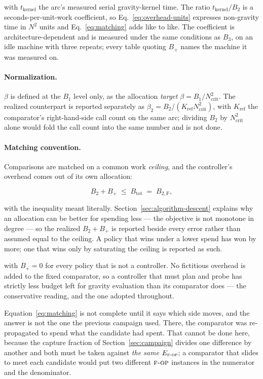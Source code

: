 with $t_{\mathrm{kernel}}$ the arc's measured serial gravity-kernel time. The
ratio $t_{\mathrm{kernel}}/B_2$ is a seconds-per-unit-work coefficient, so
Eq.~\eqref{eq:overhead-units} expresses non-gravity time in $N^2$ units and
Eq.~\eqref{eq:matching} adds like to like. The coefficient is
architecture-dependent and is measured under the same conditions as $B_3$, on
an idle machine with three repeats; every table quoting $B_+$ names the machine
it was measured on.

\paragraph{Normalization.} $\beta$ is defined at the $B_1$ level only, as the
allocation \emph{target} $\beta=B_1/N_{\mathrm{crit}}^2$. The realized
counterpart is reported separately as
$\beta_2 = B_2/(K_{\mathrm{ref}}N_{\mathrm{crit}}^2)$, with
$K_{\mathrm{ref}}$ the comparator's right-hand-side call count on the same arc;
dividing $B_2$ by $N_{\mathrm{crit}}^2$ alone would fold the call count into
the same number and is not done.

\paragraph{Matching convention.} Comparisons are matched on a common work
\emph{ceiling}, and the controller's overhead comes out of its own allocation:

\begin{equation}
  B_2 + B_+ \;\le\; B_{\mathrm{tot}} \;=\; B_{2,\mathrm{F}} ,
  \label{eq:matching}
\end{equation}

with the inequality meant literally. Section~\ref{sec:algorithm-descent}
explains why an allocation can be better for spending less --- the objective
is not monotone in degree --- so the realized $B_2+B_+$ is reported beside
every error rather than assumed equal to the ceiling. A policy that wins under
a lower spend has won by more; one that wins only by saturating the ceiling is
reported as such.

with $B_+=0$ for every policy that is not a controller. No fictitious overhead
is added to the fixed comparator, so a controller that must plan and probe has
strictly less budget left for gravity evaluation than its comparator does ---
the conservative reading, and the one adopted throughout.

Equation~\eqref{eq:matching} is not complete until it says which side moves,
and the answer is not the one the previous campaign used. There, the comparator
was re-propagated to spend what the candidate had spent. That cannot be done
here, because the capture fraction of Section~\ref{sec:campaign} divides one
difference by another and both must be taken against \emph{the same}
$E_{\textsc{f-op}}$; a comparator that slides to meet each candidate would put two
different $\textsc{f-op}$ instances in the numerator and the denominator.

